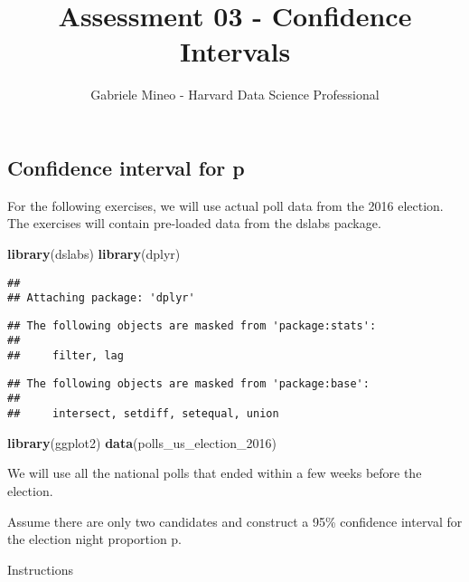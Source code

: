 \documentclass[]{article}
\title{Assessment 03 - Confidence Intervals}
\author{Gabriele Mineo - Harvard Data Science Professional}
\date{}
\newenvironment{Shaded}{\begin{snugshade}}{\end{snugshade}}
\newcommand{\KeywordTok}[1]{\textcolor[rgb]{0.13,0.29,0.53}{\textbf{#1}}}
\newcommand{\DecValTok}[1]{\textcolor[rgb]{0.00,0.00,0.81}{#1}}
\newcommand{\NormalTok}[1]{#1}
\begin{document}
\maketitle

\subsection{\texorpdfstring{\textbf{Confidence interval for
p}}{Confidence interval for p}}\label{confidence-interval-for-p}

For the following exercises, we will use actual poll data from the 2016
election. The exercises will contain pre-loaded data from the dslabs
package.

\begin{Shaded}
\begin{Highlighting}[]
\KeywordTok{library}\NormalTok{(dslabs)}
\KeywordTok{library}\NormalTok{(dplyr)}
\end{Highlighting}
\end{Shaded}

\begin{verbatim}
## 
## Attaching package: 'dplyr'
\end{verbatim}

\begin{verbatim}
## The following objects are masked from 'package:stats':
## 
##     filter, lag
\end{verbatim}

\begin{verbatim}
## The following objects are masked from 'package:base':
## 
##     intersect, setdiff, setequal, union
\end{verbatim}

\begin{Shaded}
\begin{Highlighting}[]
\KeywordTok{library}\NormalTok{(ggplot2)}
\KeywordTok{data}\NormalTok{(polls_us_election_}\DecValTok{2016}\NormalTok{)}
\end{Highlighting}
\end{Shaded}

We will use all the national polls that ended within a few weeks before
the election.

Assume there are only two candidates and construct a 95\% confidence
interval for the election night proportion p.

Instructions
\end{document}

